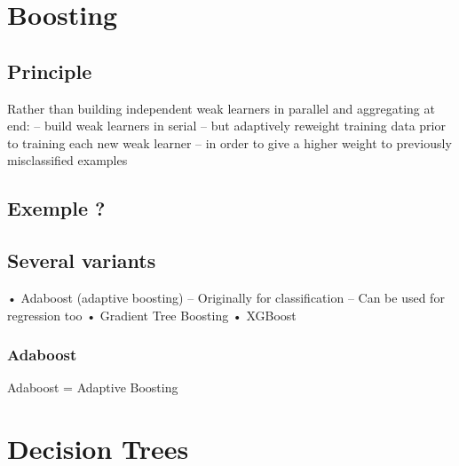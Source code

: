\section{Boosting}

	\subsection{Principle}
	Rather than building independent weak learners in parallel and
aggregating at end:
– build weak learners in serial
– but adaptively reweight training data prior to training each new weak learner
– in order to give a higher weight to previously misclassified examples

	\subsection{Exemple ?}

\subsection{Several variants}
• Adaboost (adaptive boosting)
– Originally for classification
– Can be used for regression too
• Gradient Tree Boosting
• XGBoost

\subsubsection*{Adaboost}
	Adaboost = Adaptive Boosting



\section{Decision Trees}


